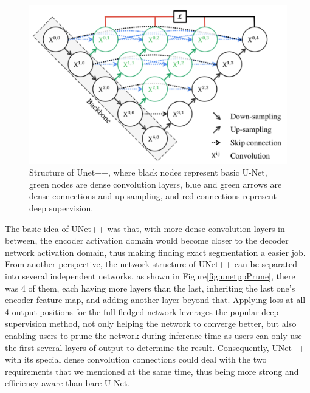 \begin{figure}[!htpb]
\centering
\includegraphics[scale=0.3]{figuras/unetStructure.png}
\caption{Structure of Unet++, where black nodes represent basic U-Net, green nodes are dense convolution layers, blue and green arrows are dense connections and up-sampling, and red connections represent deep supervision.}
\label{fig:unetppStructure}
\end{figure}

The basic idea of UNet++ was that, with more dense convolution layers in between, the encoder activation domain would become closer to the decoder network activation domain, thus making finding exact segmentation a easier job. From another perspective, the network structure of UNet++ can be separated into several independent networks, as shown in Figure\ref{fig:unetppPrune}, there was 4 of them, each having more layers than the last, inheriting the last one's encoder feature map, and adding another layer beyond that. Applying loss at all 4 output positions for the full-fledged network leverages the popular deep supervision method, not only helping the network to converge better, but also enabling users to prune the network during inference time as users can only use the first several layers of output to determine the result. Consequently, UNet++ with its special dense convolution connections could deal with the two requirements that we mentioned at the same time, thus being more strong and efficiency-aware than bare U-Net.

